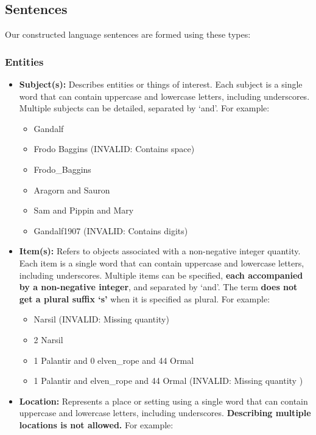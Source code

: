\documentclass[12pt]{article}
\begin{document}
\subsection{Sentences}

\indent Our constructed language sentences are formed using these types:

\subsubsection{Entities}

\begin{itemize}
\item \textbf{Subject(s):} Describes entities or things of interest. Each subject is a single word that can contain uppercase and lowercase letters, including underscores. Multiple subjects can be detailed, separated by `and'. For example:

\begin{itemize}

    \item Gandalf
    \item Frodo Baggins (INVALID: Contains space)
    \item Frodo\_Baggins
    \item Aragorn and Sauron
    \item Sam and Pippin and Mary
    \item Gandalf1907 (INVALID: Contains digits) \\
\end{itemize}

 \item \textbf{Item(s):} Refers to objects associated with a non-negative integer quantity. Each item is a single word that can contain uppercase and lowercase letters, including underscores. Multiple items can be specified, \textbf{each accompanied by a non-negative integer}, and separated by `and'. The term \textbf{does not get a plural suffix `s'} when it is specified as plural. For example:
\begin{itemize}
    \item Narsil (INVALID: Missing quantity)
    \item 2 Narsil
    \item 1 Palantir and 0 elven\_rope and 44 Ormal
    \item 1 Palantir and elven\_rope and 44 Ormal (INVALID: Missing quantity )
    \\

\end{itemize}
\item \textbf{Location:} Represents a place or setting using a single word that can contain uppercase and lowercase letters, including underscores. \textbf{Describing multiple locations is not allowed.} For example:
\begin{itemize}


\end{itemize}
\end{itemize}
\end{document}
